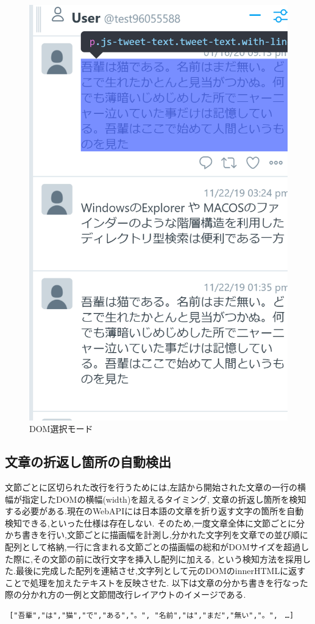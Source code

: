 \begin{figure}[H]
    \centering
    \label{fig:image10}
    \includegraphics[width=0.7\columnwidth]{image/03/img1.png}
    \caption[DOM選択モード] {DOM選択モード}
\end{figure}

\subsection{文章の折返し箇所の自動検出}
文節ごとに区切られた改行を行うためには,左詰から開始された文章の一行の横幅が指定したDOMの横幅(width)を超えるタイミング,
文章の折返し箇所を検知する必要がある.現在のWebAPIには日本語の文章を折り返す文字の箇所を自動検知できる,といった仕様は存在しない.
そのため,一度文章全体に文節ごとに分かち書きを行い,文節ごとに描画幅を計測し,分かれた文字列を文章での並び順に
配列として格納,一行に含まれる文節ごとの描画幅の総和がDOMサイズを超過した際に,その文節の前に改行文字を挿入し配列に加える,
という検知方法を採用した.最後に完成した配列を連結させ,文字列として元のDOMのinnerHTMLに返すことで処理を加えたテキストを反映させた.
以下は文章の分かち書きを行なった際の分かれ方の一例と文節間改行レイアウトのイメージである.

\begin{verbatim} ["吾輩","は","猫","で","ある","。", "名前","は","まだ","無い","。",　…]
\end{verbatim}

